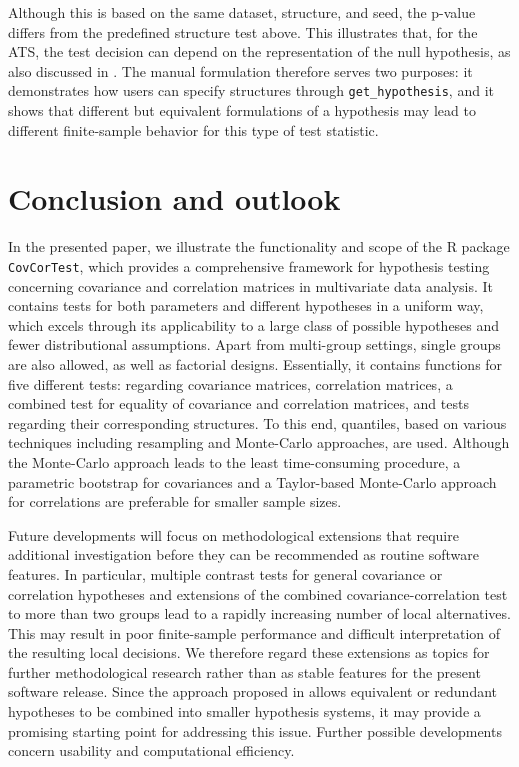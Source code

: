 Although this is based on the same dataset, structure, and seed, the p-value
differs from the predefined structure test above. This illustrates that, for the
ATS, the test decision can depend on the representation of the null hypothesis,
as also discussed in \citet{sattler2023a}. The manual formulation therefore
serves two purposes: it demonstrates how users can specify structures through
\texttt{get\_hypothesis}, and it shows that different but equivalent formulations of a
hypothesis may lead to different finite-sample behavior for this type of test
statistic.

\section{Conclusion and outlook}\label{conclusion-and-outlook}

In the presented paper, we illustrate the functionality and scope of the
R package \texttt{CovCorTest}, which provides a comprehensive framework for
hypothesis testing concerning covariance and correlation matrices in
multivariate data analysis. It contains tests for both parameters and different
hypotheses in a uniform way, which excels through its applicability to a large
class of possible hypotheses and fewer distributional assumptions. Apart from
multi-group settings, single groups are also allowed, as well as factorial
designs. Essentially, it contains functions for five different tests: regarding
covariance matrices, correlation matrices, a combined test for equality of
covariance and correlation matrices, and tests regarding their corresponding
structures. To this end, quantiles, based on various techniques including
resampling and Monte-Carlo approaches, are used. Although the Monte-Carlo
approach leads to the least time-consuming procedure, a parametric bootstrap
for covariances and a Taylor-based Monte-Carlo approach for correlations are
preferable for smaller sample sizes.

Future developments will focus on methodological extensions that require
additional investigation before they can be recommended as routine software
features. In particular, multiple contrast tests for general covariance or
correlation hypotheses and extensions of the combined covariance-correlation
test to more than two groups lead to a rapidly increasing number of local
alternatives. This may result in poor finite-sample performance and difficult
interpretation of the resulting local decisions. We therefore regard these
extensions as topics for further methodological research rather than as stable
features for the present software release. Since the approach proposed in
\citet{sattler2026} allows equivalent or redundant hypotheses to be combined
into smaller hypothesis systems, it may provide a promising starting point for
addressing this issue. Further possible developments concern usability and
computational efficiency.

